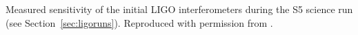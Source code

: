 \label{figure:LIGOsens}
Measured sensitivity of the initial LIGO interferometers
    during the S5 science run (see Section~\ref{sec:ligoruns}). Reproduced with permission from
    \cite{LIGOcurves}.